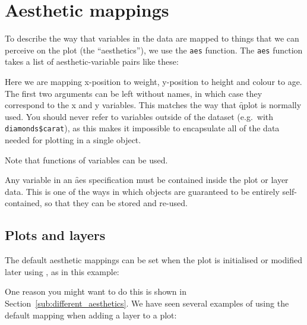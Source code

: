 \section{Aesthetic mappings}
\label{sec:aes}

To describe the way that variables in the data are mapped to things that we can perceive on the plot (the ``aesthetics''), we use the {\tt aes} function.  The {\tt aes} function takes a list of aesthetic-variable pairs like these:

% 


Here we are mapping x-position to weight, y-position to height and colour to age.  The first two arguments can be left without names, in which case they correspond to the x and y variables.  This matches the way that \f{qplot} is normally used.  You should never refer to variables outside of the dataset (e.g.\ with \verb|diamonds$carat|), as this makes it impossible to encapsulate all of the data needed for plotting in a single object.

% 

\noindent Note that functions of variables can be used.

Any variable in an \f{aes} specification must be contained inside the plot or layer data.  This is one of the ways in which \ggplot objects are guaranteed to be entirely self-contained, so that they can be stored and re-used.

\subsection{Plots and layers}
\label{sub:plots_and_layers}

The default aesthetic mappings can be set when the plot is initialised or modified later using \code{+}, as in this example:

% 
%


One reason you might want to do this is shown in Section~\ref{sub:different_aesthetics}.  We have seen several examples of using the default mapping when adding a layer to a plot:

% 


